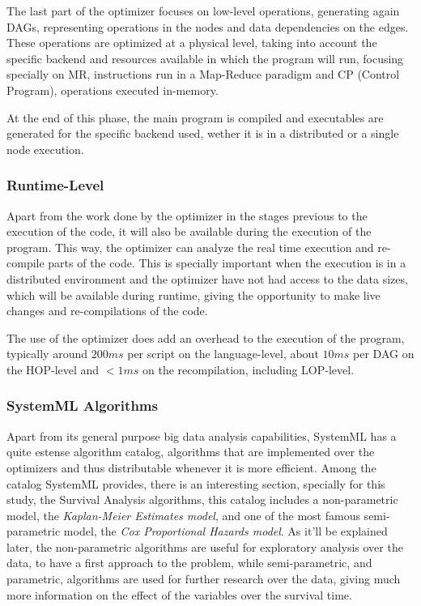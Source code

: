 \documentclass[11pt]{article} %
\begin{document}
        The last part of the optimizer focuses on low-level operations, generating again DAGs, representing operations in the nodes and data dependencies on the edges. These operations are optimized at a physical level, taking into account the specific backend and resources available in which the program will run, focusing specially on MR, instructions run in a Map-Reduce paradigm and CP (Control Program), operations executed in-memory.

        At the end of this phase, the main program is compiled and executables are generated for the specific backend used, wether it is in a distributed or a single node execution.

      \subsubsection*{Runtime-Level}

        Apart from the work done by the optimizer in the stages previous to the execution of the code, it will also be available during the execution of the program. This way, the optimizer can analyze the real time execution and re-compile parts of the code. This is specially important when the execution is in a distributed environment and the optimizer have not had access to the data sizes, which will be available during runtime, giving the opportunity to make live changes and re-compilations of the code.

      The use of the optimizer does add an overhead to the execution of the program, typically around $200ms$ per script on the language-level, about $10ms$ per DAG on the HOP-level and $<1ms$ on the recompilation, including LOP-level.

    \subsubsection{SystemML Algorithms}

      Apart from its general purpose big data analysis capabilities, SystemML has a quite estense algorithm catalog, algorithms that are implemented over the optimizers and thus distributable whenever it is more efficient. Among the catalog SystemML provides, there is an interesting section, specially for this study, the Survival Analysis algorithms, this catalog includes a non-parametric model, the \emph{Kaplan-Meier Estimates model}, and one of the most famous semi-parametric model, the \emph{Cox Proportional Hazards model}. As it'll be explained later, the non-parametric algorithms are useful for exploratory analysis over the data, to have a first approach to the problem, while semi-parametric, and parametric, algorithms are used for further research over the data, giving much more information on the effect of the variables over the survival time.
\end{document}
